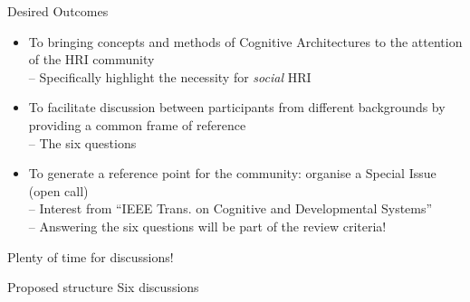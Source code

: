 \documentclass[compress]{beamer}
\begin{document}
\begin{frame}{Desired Outcomes}
    
    \begin{itemize}
    
    \item To bringing concepts and methods of Cognitive Architectures to the attention of the HRI community \\ {\footnotesize -- Specifically highlight the necessity for \emph{social} HRI}
    
    \item To facilitate discussion between participants from different backgrounds by providing a common frame of reference \\ {\footnotesize -- The six questions}
    
    \item To generate a reference point for the community: organise a Special Issue (open call) \\ {\footnotesize -- Interest from ``IEEE Trans. on Cognitive and Developmental Systems'' \\-- Answering the six questions will be part of the review criteria!}
    
    \end{itemize}
    
\end{frame}

\begin{frame}[plain]{}
    \centering
    {\Medium Plenty of time for discussions!}
\end{frame}

\begin{frame}{Proposed structure}
    \centering
    {\Medium Six discussions}\par
    \par
    \par
    \par

\end{frame}
\end{document}
